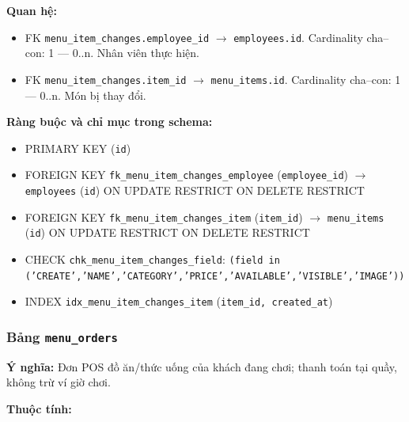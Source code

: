 \textbf{Quan hệ:}

\begin{itemize}

\item FK \texttt{menu\_item\_changes.employee\_id} $\rightarrow$ \texttt{employees.id}. Cardinality cha--con: 1 — 0..n. Nhân viên thực hiện.

\item FK \texttt{menu\_item\_changes.item\_id} $\rightarrow$ \texttt{menu\_items.id}. Cardinality cha--con: 1 — 0..n. Món bị thay đổi.

\end{itemize}

\textbf{Ràng buộc và chỉ mục trong schema:}

\begin{itemize}

\item PRIMARY KEY (\texttt{id})

\item FOREIGN KEY \texttt{fk\_menu\_item\_changes\_employee} (\texttt{employee\_id}) $\rightarrow$ \texttt{employees} (\texttt{id}) ON UPDATE RESTRICT ON DELETE RESTRICT

\item FOREIGN KEY \texttt{fk\_menu\_item\_changes\_item} (\texttt{item\_id}) $\rightarrow$ \texttt{menu\_items} (\texttt{id}) ON UPDATE RESTRICT ON DELETE RESTRICT

\item CHECK \texttt{chk\_menu\_item\_changes\_field}: \texttt{(field in ('CREATE','NAME','CATEGORY','PRICE','AVAILABLE','VISIBLE','IMAGE'))}

\item INDEX \texttt{idx\_menu\_item\_changes\_item} (\texttt{item\_id, created\_at})

\end{itemize}

\subsubsection{Bảng \texttt{menu\_orders}}

\textbf{Ý nghĩa:} Đơn POS đồ ăn/thức uống của khách đang chơi; thanh toán tại quầy, không trừ ví giờ chơi.\par

\textbf{Thuộc tính:}

